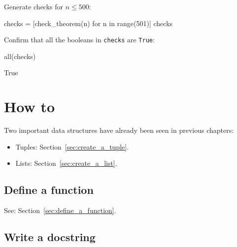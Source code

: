 Generate checks for \(n\leq 500\):





\begin{pyin}
checks = [check_theorem(n) for n in range(501)]
checks
\end{pyin}





\begin{raw}
\end{raw}






Confirm that all the booleans in \texttt{checks} are \texttt{True}:




\begin{pyin}
all(checks)
\end{pyin}





\begin{raw}
True
\end{raw}

\section{How to}
\label{\detokenize{building-tools/02-functions-and-data-structures/how/main:how}}\label{\detokenize{building-tools/02-functions-and-data-structures/how/main::doc}}

Two important data structures have already been seen in previous chapters:
\begin{itemize}
\item 

Tuples: Section~\ref{sec:create_a_tuple}.

\item 

Lists: Section~\ref{sec:create_a_list}.

\end{itemize}


\subsection{Define a function}

See: Section~\ref{sec:define_a_function}.


\subsection{Write a docstring}
\label{sec:write_a_docstring}

